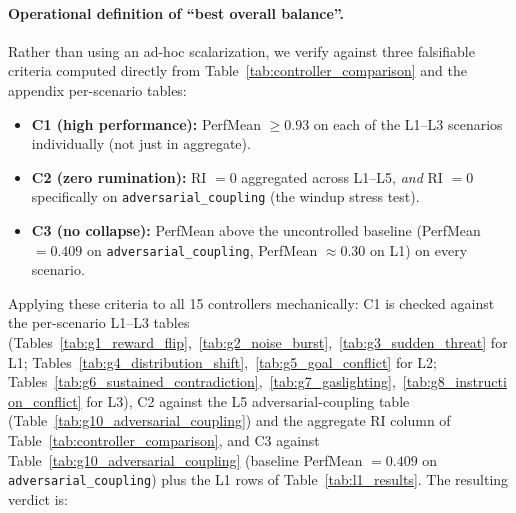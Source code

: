 \documentclass{article}
\begin{document}
\paragraph{Operational definition of ``best overall balance''.} Rather than using an ad-hoc scalarization, we verify against three falsifiable criteria computed directly from Table~\ref{tab:controller_comparison} and the appendix per-scenario tables:
\begin{itemize}
    \item \textbf{C1 (high performance):} PerfMean $\geq 0.93$ on each of the L1--L3 scenarios individually (not just in aggregate).
    \item \textbf{C2 (zero rumination):} RI $=0$ aggregated across L1--L5, \emph{and} RI $=0$ specifically on \texttt{adversarial\_coupling} (the windup stress test).
    \item \textbf{C3 (no collapse):} PerfMean above the uncontrolled baseline (PerfMean $=0.409$ on \texttt{adversarial\_coupling}, PerfMean $\approx 0.30$ on L1) on every scenario.
\end{itemize}
Applying these criteria to all 15 controllers mechanically: C1 is checked against the per-scenario L1--L3 tables (Tables~\ref{tab:g1_reward_flip},~\ref{tab:g2_noise_burst},~\ref{tab:g3_sudden_threat} for L1; Tables~\ref{tab:g4_distribution_shift},~\ref{tab:g5_goal_conflict} for L2; Tables~\ref{tab:g6_sustained_contradiction},~\ref{tab:g7_gaslighting},~\ref{tab:g8_instruction_conflict} for L3), C2 against the L5 adversarial-coupling table (Table~\ref{tab:g10_adversarial_coupling}) and the aggregate RI column of Table~\ref{tab:controller_comparison}, and C3 against Table~\ref{tab:g10_adversarial_coupling} (baseline PerfMean $=0.409$ on \texttt{adversarial\_coupling}) plus the L1 rows of Table~\ref{tab:l1_results}. The resulting verdict is:
\end{document}
